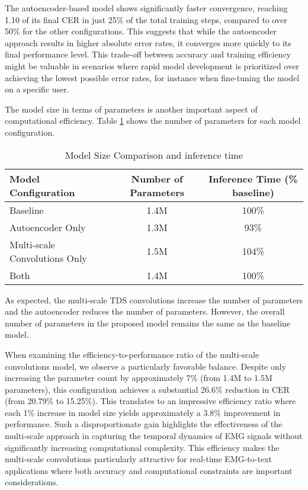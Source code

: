 The autoencoder-based model shows significantly faster convergence, reaching 1.10 of its final CER in just 25\% of the total training steps, compared to over 50\% for the other configurations. This suggests that while the autoencoder approach results in higher absolute error rates, it converges more quickly to its final performance level. This trade-off between accuracy and training efficiency might be valuable in scenarios where rapid model development is prioritized over achieving the lowest possible error rates, for instance when fine-tuning the model on a specific user.

The model size in terms of parameters is another important aspect of computational efficiency. Table \ref{tab:model_size} shows the number of parameters for each model configuration.

\begin{table}[h]
    \centering
    \caption{Model Size Comparison and inference time}
    \begin{tabular}{lcc}
        \hline
        \textbf{Model Configuration}  & \textbf{Number of Parameters} & \textbf{Inference Time (\% baseline)} \\
        \hline
        Baseline                      & 1.4M                          & 100\%                                 \\
        Autoencoder Only              & 1.3M                          & 93\%                                  \\
        Multi-scale Convolutions Only & 1.5M                          & 104\%                                 \\
        Both                          & 1.4M                          & 100\%                                 \\
        \hline
    \end{tabular}
    \label{tab:model_size}
\end{table}

As expected, the multi-scale TDS convolutions increase the number of parameters and the autoencoder reduces the number of parameters. However, the overall number of parameters in the proposed model remains the same as the baseline model.

When examining the efficiency-to-performance ratio of the multi-scale convolutions model, we observe a particularly favorable balance. Despite only increasing the parameter count by approximately 7\% (from 1.4M to 1.5M parameters), this configuration achieves a substantial 26.6\% reduction in CER (from 20.79\% to 15.25\%). This translates to an impressive efficiency ratio where each 1\% increase in model size yields approximately a 3.8\% improvement in performance. Such a disproportionate gain highlights the effectiveness of the multi-scale approach in capturing the temporal dynamics of EMG signals without significantly increasing computational complexity. This efficiency makes the multi-scale convolutions particularly attractive for real-time EMG-to-text applications where both accuracy and computational constraints are important considerations.

